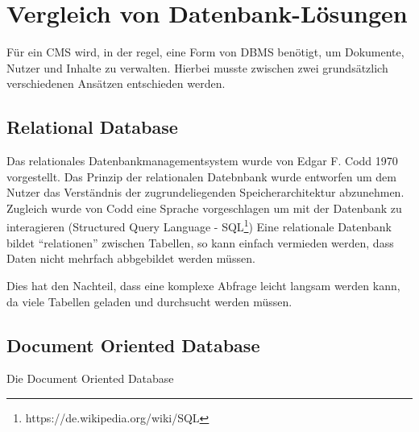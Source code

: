 \section{Vergleich von Datenbank-Lösungen}
Für ein \ac{CMS} wird, in der regel, eine Form von \ac{DBMS} benötigt, um Dokumente,
Nutzer  und Inhalte zu verwalten. Hierbei musste zwischen zwei grundsätzlich verschiedenen Ansätzen entschieden werden.
\subsection{Relational Database}
Das relationales Datenbankmanagementsystem wurde von Edgar F. Codd 1970 vorgestellt. Das Prinzip der relationalen Datebnbank wurde entworfen um dem Nutzer das Verständnis der zugrundeliegenden Speicherarchitektur abzunehmen. Zugleich wurde von Codd eine Sprache vorgeschlagen um mit der Datenbank zu interagieren (Structured Query Language - SQL\footnote{https://de.wikipedia.org/wiki/SQL})
Eine relationale Datenbank bildet ``relationen'' zwischen Tabellen, so kann einfach vermieden werden, dass Daten
nicht mehrfach abbgebildet werden müssen.

\cite{codd}

Dies hat den Nachteil, dass eine komplexe Abfrage leicht langsam werden kann,
 da viele Tabellen geladen und durchsucht werden müssen.

\subsection{Document Oriented Database}
Die Document Oriented Database 
